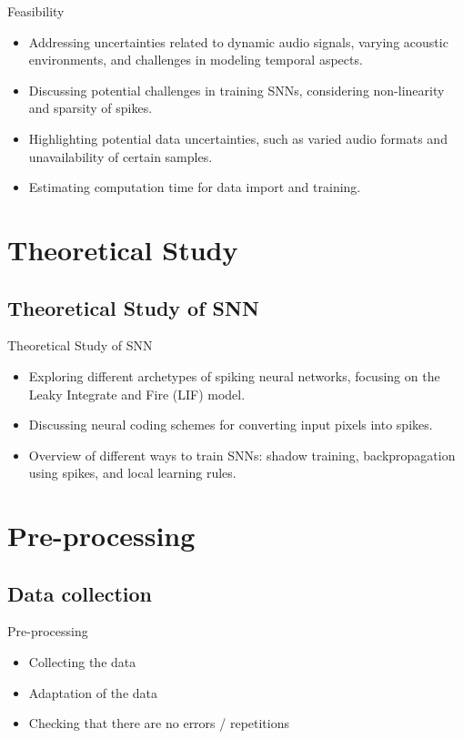 \documentclass[aspectratio=169, 11pt]{beamer}
\begin{document}
\begin{frame}{Feasibility}
  \begin{itemize}
    \item Addressing uncertainties related to dynamic audio signals, varying acoustic environments, and challenges in modeling temporal aspects.
    \item Discussing potential challenges in training SNNs, considering non-linearity and sparsity of spikes.
    \item Highlighting potential data uncertainties, such as varied audio formats and unavailability of certain samples.
    \item Estimating computation time for data import and training.
  \end{itemize}
\end{frame}

\section{Theoretical Study}

\subsection{Theoretical Study of SNN}

\begin{frame}{Theoretical Study of SNN}
  \begin{itemize}
    \item Exploring different archetypes of spiking neural networks, focusing on the Leaky Integrate and Fire (LIF) model.
    \item Discussing neural coding schemes for converting input pixels into spikes.
    \item Overview of different ways to train SNNs: shadow training, backpropagation using spikes, and local learning rules.
  \end{itemize}
\end{frame}

\section{Pre-processing}

\subsection{Data collection}

\begin{frame}{Pre-processing}
  \begin{itemize}
    \item Collecting the data
    \item Adaptation of the data
    \item Checking that there are no errors / repetitions
  \end{itemize}
\end{frame}
\end{document}
